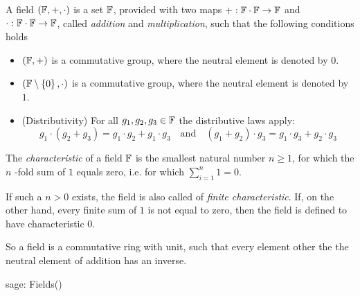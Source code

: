 \begin{definition}[Field]
A field $ (\mathbb{F}, +, \cdot) $ is a set $ \mathbb{F}$, provided with two maps $ +: \mathbb{F} \cdot \mathbb{F} \to \mathbb{F} $ and $ \cdot: \mathbb{F} \cdot \mathbb{F} \to \mathbb{F} $, called \textit{addition} and \textit{multiplication}, such that the following conditions holds
\begin{itemize}
\item $ \left (\mathbb{F}, + \right) $ is a commutative group, where the neutral element is denoted by $ 0 $.
\item $ \left (\mathbb{F} \setminus \left \{0 \right \}, \cdot \right) $ is a commutative group, where the neutral element is denoted by $ 1 $.
\item (Distributivity) For all $ g_1, g_2, g_3 \in \mathbb{F} $ the distributive laws apply:
$$ g_1 \cdot \left (g_2 + g_3 \right) = g_1 \cdot g_2 + g_1 \cdot g_3 \quad \text{and} \quad
\left (g_1 + g_2 \right) \cdot g_3 = g_1 \cdot g_3 + g_2 \cdot g_3 $$
\end{itemize}
The \textit{characteristic} of a field $ \mathbb{F} $ is the smallest natural number $ n \geq 1 $, for which the $ n $ -fold sum of $ 1 $ equals zero, i.e. for which $ \sum_{i = 1} ^ n 1 = 0 $.

If such a $ n> 0 $ exists, the field is also called of \textit{finite characteristic}. If, on the other hand, every finite sum of $1$ is not equal to zero, then the field is defined to have characteristic $ 0 $.
\end{definition}
So a field is a commutative ring with unit, such that every element other the the neutral element of addition has an inverse.

\begin{sagecommandline}
sage: Fields()
\end{sagecommandline}

